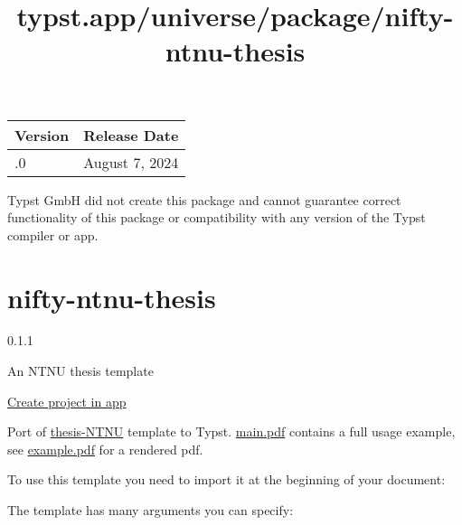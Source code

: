 \begin{longtable}[]{@{}ll@{}}
\toprule\noalign{}
Version & Release Date \\
\midrule\noalign{}
\endhead
\bottomrule\noalign{}
\endlastfoot
0.1.0 & August 7, 2024 \\
\end{longtable}

Typst GmbH did not create this package and cannot guarantee correct
functionality of this package or compatibility with any version of the
Typst compiler or app.


\title{typst.app/universe/package/nifty-ntnu-thesis}

\label{banner}
\label{template-thumbnail}

\section{nifty-ntnu-thesis}\label{nifty-ntnu-thesis}

{ 0.1.1 }

An NTNU thesis template

\href{/app?template=nifty-ntnu-thesis&version=0.1.1}{Create project in
app}

\label{readme}
Port of \href{https://github.com/COPCSE-NTNU/thesis-NTNU}{thesis-NTNU}
template to Typst.
\href{https://github.com/saimnaveediqbal/thesis-NTNU-typst/blob/main/template/main.typ}{main.pdf}
contains a full usage example, see
\href{https://github.com/saimnaveediqbal/thesis-NTNU-typst/blob/main/example.pdf}{example.pdf}
for a rendered pdf.

To use this template you need to import it at the beginning of your
document:

\begin{Shaded}
\begin{Highlighting}[]
\end{Highlighting}
\end{Shaded}

The template has many arguments you can specify:

